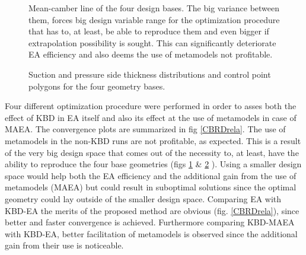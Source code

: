 \begin{figure}[h!]
\begin{minipage}[b]{1\linewidth}
 \centering
\end{minipage}
\caption{Mean-camber line of the four design bases. The big variance between them, forces big design variable range for the optimization procedure that has to, at least, be able to reproduce them and even bigger if extrapolation possibility is sought. This can significantly deteriorate EA efficiency and also deems the use of metamodels not profitable. } 
\label{CBRDmm}
\end{figure}

\begin{figure}[h!]
\begin{minipage}[b]{1\linewidth}
 \centering
\end{minipage}
\caption{Suction and pressure side thickness distributions and control point polygons for the four geometry bases.} 
\label{CBRDtt}
\end{figure}

Four different optimization procedure were performed in order to asses both the effect of KBD in EA itself and also its effect at the use of metamodels in case of MAEA. The convergence plots are summarized in fig \ref{CBRDrela}. The use of metamodels in the non-KBD runs are not profitable, as expected. This is a result of the very big design space that comes out of the necessity to, at least, have the ability to reproduce the four base geometries (figs \ref{CBRDmm} \& \ref{CBRDtt} ). Using a smaller design space would help both the EA efficiency and the additional gain from the use of metamodels (MAEA) but could result in suboptimal solutions since the optimal geometry could lay outside of the smaller design space. Comparing EA with KBD-EA the merits of the proposed method are obvious (fig. \ref{CBRDrela}), since better and faster convergence is achieved. Furthermore comparing KBD-MAEA with  KBD-EA,  better facilitation of metamodels is observed since the additional gain from their use is noticeable. 


